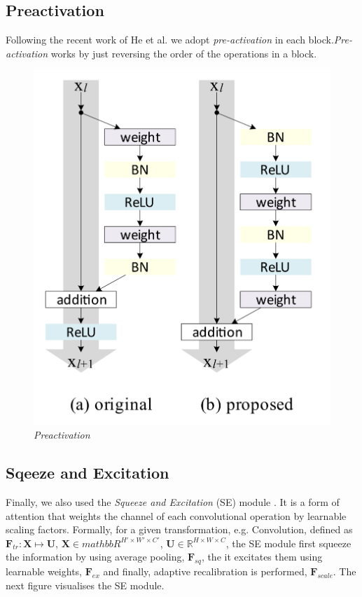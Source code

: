 \documentclass[../document.tex]{subfiles}
\begin{document}
\subsection{Preactivation}
Following the recent work of He et al. \cite{he2015identity} we adopt \emph{pre-activation} in each block.\emph{Pre-activation} works by just reversing the order of the operations in a block.

\begin{figure}[H]
    \centering
    \includegraphics[scale=0.2]{../img/implementation/estimator/preactivation.png}
    \caption{\emph{Preactivation} \cite{he2015identity}}
\end{figure}
\subsection{Sqeeze and Excitation}
Finally, we also used the \emph{Squeeze and Excitation} (SE) module \cite{hu2017squeeze}. It is a form of attention that weights the channel of each convolutional operation by learnable scaling factors. Formally, for a given transformation, e.g. Convolution, defined as $\bm{F}_{tr}  : \bm{X} \mapsto \bm{U}$, $\bm{X} \in mathbb{R}^{H' \times W' \times C'}$, $\bm{U} \in \mathbb{R}^{H \times W \times C}$, the SE module first squeeze the information by using average pooling, $\bm{F}_{sq}$, the it excitates them using learnable weights, $\bm{F}_{ex}$ and finally, adaptive recalibration is performed, $\bm{F}_{scale}$.
The next figure visualises the SE module.
\end{document}
